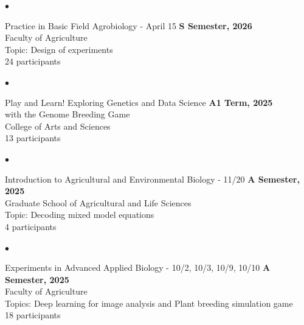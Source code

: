 \documentclass[margin,line,10pt]{res}
\newenvironment{list2}{
  \begin{list}{$\bullet$}{%
      \setlength{\itemsep}{0in}
      \setlength{\parsep}{0in} \setlength{\parskip}{0in}
      \setlength{\topsep}{0in} \setlength{\partopsep}{0in} 
      \setlength{\leftmargin}{0.2in}}}{\end{list}}
\begin{document}
\begin{resume}
\vspace{0.4cm}

\begin{list2}
  \item Practice in Basic Field Agrobiology - April 15 \hfill {\bf S Semester, 2026} \\ %
  Faculty of Agriculture \\ %
  Topic: Design of experiments \\ %
  24  participants 
\end{list2}


\vspace{0.4cm}












\begin{list2}
  \item  Play and Learn! Exploring Genetics and Data Science  \hfill {\bf A1 Term, 2025} \\ %
  with the Genome Breeding Game \\
  College of Arts and Sciences \\ %
  13  participants 
\end{list2}


\vspace{0.4cm}


\begin{list2}
  \item Introduction to Agricultural and Environmental Biology - 11/20 \hfill {\bf A Semester, 2025} \\ %
  Graduate School of Agricultural and Life Sciences \\ %
  Topic: Decoding mixed model equations \\
  4  participants 
\end{list2}


\vspace{0.4cm}

\begin{list2}
  \item Experiments in Advanced Applied Biology - 10/2, 10/3, 10/9, 10/10 \hfill {\bf A Semester, 2025} \\ %
  Faculty of Agriculture \\ %
  Topics: Deep learning for image analysis and Plant breeding simulation game \\
  18  participants 
\end{list2}


\end{resume}
\end{document}
